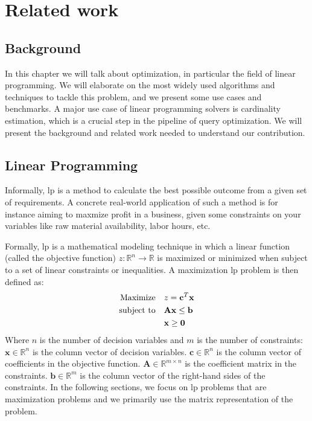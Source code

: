 
\chapter{Related work}\label{chapter:relatedwork}

\section{Background}
In this chapter we will talk about optimization, in particular the field
of linear programming. We will elaborate on
the most widely used algorithms and techniques to tackle this problem,
and we present some use cases and benchmarks.
A major use case of linear programming solvers is cardinality estimation, which
is a crucial step in the pipeline of query optimization. We will present
the background and related work needed to understand our contribution.

\section{Linear Programming}
Informally, \gls{lp} is a method to calculate the best possible outcome from a given set
of requirements. A concrete real-world application of such a method is
for instance aiming to maxmize profit in a business, given some constraints on your variables
like raw material availability, labor hours, etc.

Formally, \gls{lp} is a mathematical modeling technique in which
a linear function (called the objective function) \( z: \mathbb{R}^n \to \mathbb{R} \)
is maximized or minimized when subject to a set of linear constraints or inequalities.
A maximization \gls{lp} problem is then defined as:
\begin{align}
    \text{Maximize} \quad   & z = \mathbf{c}^T \mathbf{x} \notag            \\
    \text{subject to} \quad & \mathbf{A} \mathbf{x} \leq \mathbf{b} \notag  \\
                            & \mathbf{x} \geq \mathbf{0} \label{LP_Problem}
\end{align}
Where $n$ is the number of decision variables and $m$ is the number of constraints:
\(\mathbf{x} \in \mathbb{R}^n\) is the column vector of decision variables.
\(\mathbf{c} \in \mathbb{R}^n\) is the column vector of coefficients in the objective function.
\(\mathbf{A} \in \mathbb{R}^{m \times n}\) is the coefficient matrix in the constraints.
\(\mathbf{b} \in \mathbb{R}^m\) is the column vector of the right-hand sides of the constraints.
In the following sections, we focus on \gls{lp} problems that are maximization problems and we primarily
use the matrix representation of the problem.

